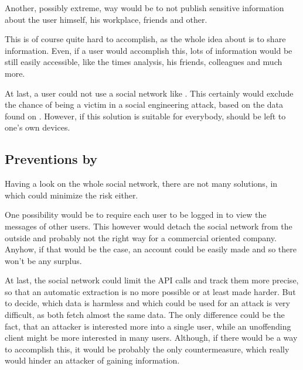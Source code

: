 Another, possibly extreme, way would be to not publish sensitive information
about the user himself, his workplace, friends and other.

This is of course quite hard to accomplish, as the whole idea about \Twitter{}
is to share information. Even, if a user would accomplish this, lots of
information would be still easily accessible, like the times analysis, his
friends, colleagues and much more.

At last, a user could not use a social network like \Twitter{}. This certainly
would exclude the chance of being a victim in a social engineering attack,
based on the data found on \Twitter{}. However, if this solution is suitable
for everybody, should be left to one's own devices.

\subsection{Preventions by \Twitter{}}

Having a look on the whole social network, there are not many solutions, in
which \Twitter{} could minimize the risk either.

One possibility would be to require each user to be logged in to view the
messages of other users. This however would detach the \Twitter{} social
network from the outside and probably not the right way for a commercial
oriented company. Anyhow, if that would be the case, an account could be easily
made and so there won't be any surplus.

At last, the social network could limit the API calls and track them more
precise, so that an automatic extraction is no more possible or at least made
harder. But to decide, which data is harmless and which could be used for an
attack is very difficult, as both fetch almost the same data. The only
difference could be the fact, that an attacker is interested more into a single
user, while an unoffending \Twitter{} client might be more interested in many
users. Although, if there would be a way to accomplish this, it would be
probably the only countermeasure, which really would hinder an attacker of
gaining information.
